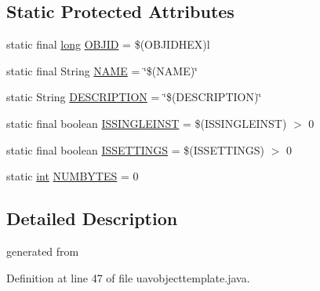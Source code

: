\subsection*{Static Protected Attributes}
\begin{DoxyCompactItemize}
\item 
static final \hyperlink{ioapi_8h_a3c7b35ad9dab18b8310343c201f7b27e}{long} \hyperlink{classorg_1_1taulabs_1_1uavtalk_1_1uavobjects_1_1_n_a_m_e_aa73eb8b7406db9b95c3b3b4acf1d9179}{O\-B\-J\-I\-D} = \$(O\-B\-J\-I\-D\-H\-E\-X)l
\item 
static final String \hyperlink{classorg_1_1taulabs_1_1uavtalk_1_1uavobjects_1_1_n_a_m_e_afd84e575e74e2679b4014ece95b79cd8}{N\-A\-M\-E} = \char`\"{}\$(N\-A\-M\-E)\char`\"{}
\item 
static String \hyperlink{classorg_1_1taulabs_1_1uavtalk_1_1uavobjects_1_1_n_a_m_e_a671fd893cc1211bc0187065df6851eab}{D\-E\-S\-C\-R\-I\-P\-T\-I\-O\-N} = \char`\"{}\$(D\-E\-S\-C\-R\-I\-P\-T\-I\-O\-N)\char`\"{}
\item 
static final boolean \hyperlink{classorg_1_1taulabs_1_1uavtalk_1_1uavobjects_1_1_n_a_m_e_af3f4d99486bc619bb1a39e7e5454a064}{I\-S\-S\-I\-N\-G\-L\-E\-I\-N\-S\-T} = \$(I\-S\-S\-I\-N\-G\-L\-E\-I\-N\-S\-T) $>$ 0
\item 
static final boolean \hyperlink{classorg_1_1taulabs_1_1uavtalk_1_1uavobjects_1_1_n_a_m_e_adf60b0b2d0e32fa1f7b03be20e2bd9d0}{I\-S\-S\-E\-T\-T\-I\-N\-G\-S} = \$(I\-S\-S\-E\-T\-T\-I\-N\-G\-S) $>$ 0
\item 
static \hyperlink{ioapi_8h_a787fa3cf048117ba7123753c1e74fcd6}{int} \hyperlink{classorg_1_1taulabs_1_1uavtalk_1_1uavobjects_1_1_n_a_m_e_aec9f550a419c1daec48b8f8019df46a2}{N\-U\-M\-B\-Y\-T\-E\-S} = 0
\end{DoxyCompactItemize}


\subsection{Detailed Description}
generated from  

Definition at line 47 of file uavobjecttemplate.\-java.



